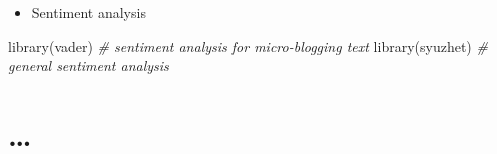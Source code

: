 \documentclass[
]{article}
\newenvironment{Shaded}{\begin{snugshade}}{\end{snugshade}}
\newcommand{\CommentTok}[1]{\textcolor[rgb]{0.56,0.35,0.01}{\textit{#1}}}
\newcommand{\FunctionTok}[1]{\textcolor[rgb]{0.00,0.00,0.00}{#1}}
\newcommand{\NormalTok}[1]{#1}
\providecommand{\tightlist}{%
  \setlength{\itemsep}{0pt}\setlength{\parskip}{0pt}}
\begin{document}
\begin{itemize}
\tightlist
\item
  Sentiment analysis
\end{itemize}

\begin{Shaded}
\begin{Highlighting}[]
\FunctionTok{library}\NormalTok{(vader)  }\CommentTok{\# sentiment analysis for micro{-}blogging text}
\FunctionTok{library}\NormalTok{(syuzhet)  }\CommentTok{\# general sentiment analysis}
\end{Highlighting}
\end{Shaded}

\hypertarget{appendix-appendix}{%
\appendix}


\hypertarget{section-1}{%
\section{\ldots{}}\label{section-1}}

  
\end{document}
